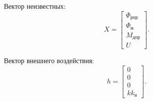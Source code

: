 Вектор неизвестных:
\[
    X=
    \begin{bmatrix}
        \Phi_{\text{рпр}}
        \\
        \Phi_{\text{м}}
        \\
        M_{\text{дпр}}
        \\
        U
    \end{bmatrix}.
\]

Вектор внешнего воздействия:
\[
    h=
    \begin{bmatrix}
        0
        \\
        0
        \\
        0
        \\
        kk_{\text{и}}
    \end{bmatrix}.
\]
